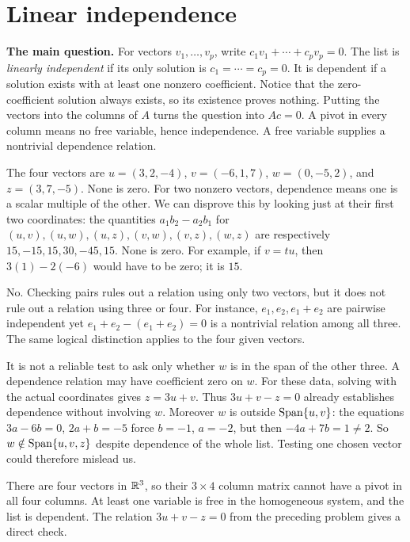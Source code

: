 \section{Linear independence}
\textbf{The main question.} For vectors $v_1,\ldots,v_p$, write
$c_1v_1+\cdots+c_pv_p=0$. The list is \emph{linearly independent}
if its only solution is $c_1=\cdots=c_p=0$. It is dependent if a
solution exists with at least one nonzero coefficient. Notice that the
zero-coefficient solution always exists, so its existence proves nothing.
Putting the vectors into the columns of $A$ turns the question into
$Ac=0$. A pivot in every column means no free variable, hence independence.
A free variable supplies a nontrivial dependence relation.

The four vectors are $u=(3,2,-4)$, $v=(-6,1,7)$, $w=(0,-5,2)$,
and $z=(3,7,-5)$. None is zero. For two nonzero vectors, dependence
means one is a scalar multiple of the other. We can disprove this
by looking just at their first two coordinates: the quantities
$a_1b_2-a_2b_1$ for $(u,v),(u,w),(u,z),(v,w),(v,z),(w,z)$ are
respectively $15,-15,15,30,-45,15$. None is zero. For example, if
$v=tu$, then $3(1)-2(-6)$ would have to be zero; it is $15$.

No. Checking pairs rules out a relation using only two vectors, but
it does not rule out a relation using three or four. For instance,
$e_1,e_2,e_1+e_2$ are pairwise independent yet
$e_1+e_2-(e_1+e_2)=0$ is a nontrivial relation among all three.
The same logical distinction applies to the four given vectors.

It is not a reliable test to ask only whether $w$ is in the span of
the other three. A dependence relation may have coefficient zero on
$w$. For these data, solving with the actual coordinates gives $z=3u+v$. Thus $3u+v-z=0$
already establishes dependence without involving $w$.
Moreover $w$ is outside $\operatorname{Span}\{u,v\}$: the equations
$3a-6b=0$, $2a+b=-5$ force $b=-1$, $a=-2$, but then
$-4a+7b=1\ne2$. So $w\notin\operatorname{Span}\{u,v,z\}$ despite dependence
of the whole list. Testing one chosen vector could therefore mislead us.

There are four vectors in $\mathbb{R}^3$, so their $3\times4$ column matrix
cannot have a pivot in all four columns. At least one variable is free
in the homogeneous system, and the list is dependent. The relation
$3u+v-z=0$ from the preceding problem gives a direct check.


